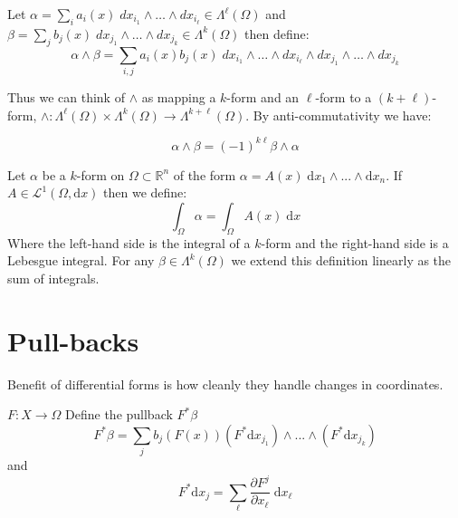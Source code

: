 \begin{definition}
	Let $\alpha = \sum_i a_i(x) \; dx_{i_1} \wedge \ldots \wedge dx_{i_\ell} \in \Lambda^\ell(\Omega)$ 
	and $\beta = \sum_j b_j(x) \; dx_{j_1} \wedge \ldots \wedge dx_{j_k} \in \Lambda^k(\Omega)$ then define:
	\begin{equation}
		\alpha \wedge \beta  = \sum_{i,j} a_i(x) b_j(x) \; 
			dx_{i_1} \wedge \ldots \wedge dx_{i_\ell} \wedge 
			dx_{j_1} \wedge \ldots \wedge dx_{j_k}
	\end{equation}
\end{definition}

Thus we can think of $\wedge$ as mapping a $k$-form and an $\ell$-form to a $(k+\ell)$-form, $\wedge : \Lambda^\ell(\Omega) \times \Lambda^k (\Omega) \to \Lambda^{k+\ell} (\Omega)$. By anti-commutativity we have:

\begin{equation}
\alpha \wedge \beta = (-1)^{k \ell} \beta \wedge \alpha
\end{equation}


\begin{definition}
Let $\alpha$ be a $k$-form on $\Omega \subset \mathbb{R}^n$ of the form $\alpha = A(x) \; \text{d}x_1 \wedge ... \wedge \text{d} x_n$.
If $A \in \mathcal{L}^1 (\Omega , \text{d}x)$ then we define:
\begin{equation}
\int_\Omega \alpha = \int_\Omega A(x) \; \text{d}x
\end{equation}
Where the left-hand side is the integral of a $k$-form and the right-hand side is a Lebesgue integral.
For any $\beta \in \Lambda^k (\Omega)$ we extend this definition linearly as the sum of integrals.
\end{definition}


%
%

\section{Pull-backs}

Benefit of differential forms is how cleanly they handle changes in coordinates.

\begin{definition}
$F: X \to \Omega$
Define the pullback $F^* \beta$
\begin{equation}
F^* \beta = \sum_j  b_j ( F(x)) (F^* \text{d}x_{j_1}) \wedge ... \wedge (F^* \text{d} x_{j_k})
\end{equation}
and
\begin{equation}
F^* \text{d}x_j = \sum_\ell \frac{\partial F^j}{\partial x_\ell} \; \text{d} x_\ell
\end{equation}
\end{definition}

